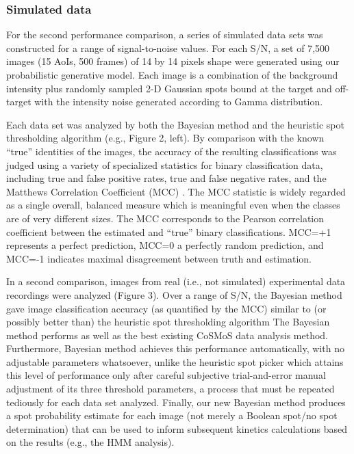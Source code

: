 \subsubsection{Simulated data}

For the second performance comparison, a series of simulated data sets was constructed for a range of signal-to-noise values. For each S/N, a set of 7,500 images (15 AoIs, 500 frames) of 14 by 14 pixels shape were generated using our probabilistic generative model. Each image is a combination of the background intensity plus randomly sampled 2-D Gaussian spots bound at the target and off-target with the intensity noise generated according to Gamma distribution.

Each data set was analyzed by both the Bayesian method and the heuristic spot thresholding algorithm (e.g., Figure 2, left). By comparison with the known “true” identities of the images, the accuracy of the resulting classifications was judged using a variety of specialized statistics for binary classification data, including true and false positive rates, true and false negative rates, and the Matthews Correlation Coefficient (MCC) \citep{Fawcett2006-bq, Matthews1975-rw}. The MCC statistic is widely regarded as a single overall, balanced measure which is meaningful even when the classes are of very different sizes. The MCC corresponds to the Pearson correlation coefficient between the estimated and “true” binary classifications. MCC=+1 represents a perfect prediction, MCC=0 a perfectly random prediction, and MCC=-1 indicates maximal disagreement between truth and estimation.

In a second comparison, images from real (i.e., not simulated) experimental data recordings were analyzed (Figure 3). Over a range of S/N, the Bayesian method gave image classification accuracy (as quantified by the MCC) similar to (or possibly better than) the heuristic spot thresholding algorithm The Bayesian method performs as well as the best existing CoSMoS data analysis method. Furthermore, Bayesian method achieves this performance automatically, with no adjustable parameters whatsoever, unlike the heuristic spot picker which attains this level of performance only after careful subjective trial-and-error manual adjustment of its three threshold parameters, a process that must be repeated tediously for each data set analyzed. Finally, our new Bayesian method produces a spot probability estimate for each image (not merely a Boolean spot/no spot determination) that can be used to inform subsequent kinetics calculations based on the results (e.g., the HMM analysis).

